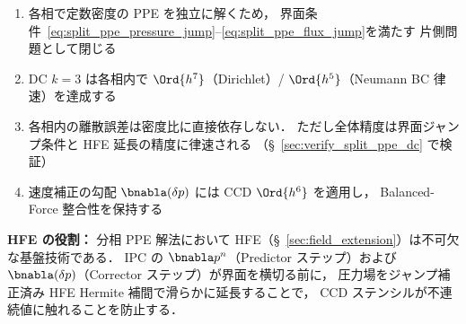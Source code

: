\begin{tcolorbox}[resultbox, title={分相 PPE + DC $k{=}3$ の精度保証}]
\begin{enumerate}[noitemsep]
  \item 各相で定数密度の PPE を独立に解くため，
        界面条件~\eqref{eq:split_ppe_pressure_jump}--\eqref{eq:split_ppe_flux_jump}を満たす
        片側問題として閉じる
  \item DC $k{=}3$ は各相内で $\Ord{h^7}$（Dirichlet）/
        $\Ord{h^5}$（Neumann BC 律速）を達成する
  \item 各相内の離散誤差は密度比に直接依存しない．
        ただし全体精度は界面ジャンプ条件と HFE 延長の精度に律速される
        （§~\ref{sec:verify_split_ppe_dc} で検証）
  \item 速度補正の勾配 $\bnabla(\delta p)$ には CCD $\Ord{h^6}$ を適用し，
        Balanced-Force 整合性を保持する
\end{enumerate}
\end{tcolorbox}

\noindent\textbf{HFE の役割：}
分相 PPE 解法において HFE（§~\ref{sec:field_extension}）は不可欠な基盤技術である．
IPC の $\bnabla p^n$（Predictor ステップ）および
$\bnabla(\delta p)$（Corrector ステップ）が界面を横切る前に，
圧力場をジャンプ補正済み HFE Hermite 補間で滑らかに延長することで，
CCD ステンシルが不連続値に触れることを防止する．
